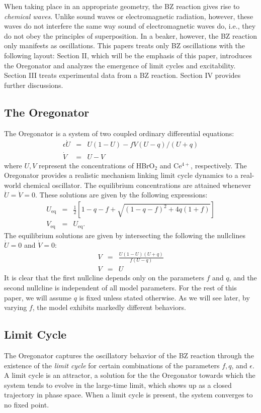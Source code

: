 \documentclass[twocolumn,amsmath,amssymb,aps]{revtex4}
\begin{document}
When taking place in an appropriate geometry, the BZ reaction gives rise to \textit{chemical waves}. Unlike sound waves or electromagnetic radiation, however, these waves do not interfere the same way sound of electromagnetic waves do, i.e., they do not obey the principles of superposition. In a beaker, however, the BZ reaction only manifests as oscillations. This papers treats only BZ oscillations with the following layout: Section II, which will be the emphasis of this paper, introduces the Oregonator and analyzes the emergence of limit cycles and excitability. Section III treats experimental data from a BZ reaction. Section IV provides further discussions.


\subsection{The Oregonator}
The Oregonator is a system of two coupled ordinary differential equations:
\begin{eqnarray}
\epsilon \dot{U} &=& U(1-U) - fV(U-q)/(U+q) \\
\dot{V} &=&  U-V
\end{eqnarray}
where $U,V$ represent the concentrations of HBrO$_2$ and Ce$^{4+}$, respectively. The Oregonator provides a realistic mechanism linking limit cycle dynamics to a real-world chemical oscillator. The equilibrium concentrations are attained whenever $\dot{U} = \dot{V} = 0$. These solutions are given by the following expressions:
\begin{eqnarray}
U_{\text{eq}} &=& \frac{1}{2}\left[1-q-f + \sqrt{(1-q-f)^2 + 4q(1+f)}\right]\nonumber \\ 
V_{\text{eq}} &=& U_{\text{eq}}. 
\end{eqnarray}
The equilibrium solutions are given by intersecting the following the nullclines $\dot{U} = 0$ and $\dot{V} = 0$:
\begin{eqnarray} 
V &=& \frac{U(1-U)(U+q)}{f(U-q)}\\
V &=&U 
\end{eqnarray}
It is clear that the first nullcline depends only on the parameters $f$ and $q$, and the second nullcline is independent of all model parameters. For the rest of this paper, we will assume $q$ is fixed unless stated otherwise. As we will see later, by varying $f$, the model exhibits markedly different behaviors. 

\subsection{Limit Cycle}
The Oregonator captures the oscillatory behavior of the BZ reaction through the existence of the \textit{limit cycle} for certain combinations of the parameters $f,q$, and $\epsilon$. A limit cycle is an attractor, a solution for the the Oregonator towards which the system tends to evolve in the large-time limit, which shows up as a closed trajectory in phase space. When a limit cycle is present, the system converges to no fixed point. 
\end{document}
